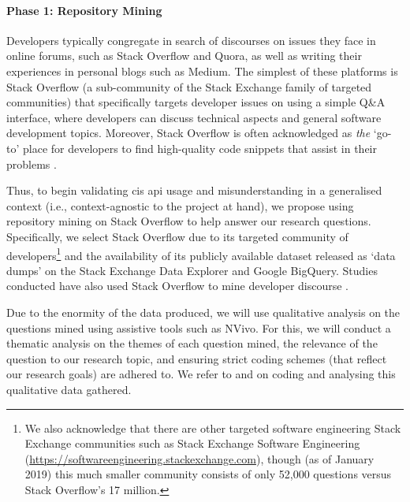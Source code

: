 \paragraph{Phase 1: Repository Mining}
Developers typically congregate in search of discourses on issues they face in online forums, such as Stack Overflow and Quora, as well as writing their experiences in personal blogs such as Medium. The simplest of these platforms is Stack Overflow (a sub-community of the Stack Exchange family of targeted communities) that specifically targets developer issues on using a simple Q\&A interface, where developers can discuss technical aspects and general software development topics. Moreover, Stack Overflow is often acknowledged as \textit{the} `go-to' place for developers to find high-quality code snippets that assist in their problems \citep{Subramanian:2014bg}.

Thus, to begin validating \gls{cis} \gls{api} usage and misunderstanding in a generalised context (i.e., context-agnostic to the project at hand), we propose using repository mining on Stack Overflow to help answer our research questions. Specifically, we select Stack Overflow due to its targeted community of developers\footnote{We also acknowledge that there are other targeted software engineering Stack Exchange communities such as Stack Exchange Software Engineering (\url{https://softwareengineering.stackexchange.com}), though (as of January 2019) this much smaller community consists of only 52,000 questions versus Stack Overflow's 17 million.} and the availability of its publicly available dataset released as `data dumps' on the Stack Exchange Data Explorer and Google BigQuery. Studies conducted have also used Stack Overflow to mine developer discourse \citep{Choi:2015wo,Sinha:2013tt,Novielli:2015vd,Rosen:2016uk,Pal:2012te,Bajaj:2014wg,LinaresVasquez:2014vj,Wang:2013ue,Barua:2012gz,Reboucas:2016tw,Allamanis:2013vb,Tahir:2018ks}.

Due to the enormity of the data produced, we will use qualitative analysis on the questions mined using assistive tools such as NVivo. For this, we will conduct a thematic analysis on the themes of each question mined, the relevance of the question to our research topic, and ensuring strict coding schemes (that reflect our research goals) are adhered to. We refer to \citet{Singer:2007tu} and \citet{Miles:1994ty} on coding and analysing this qualitative data gathered.

